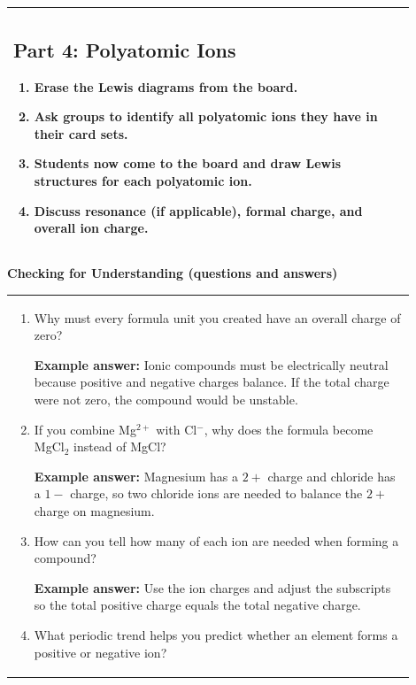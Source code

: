 \documentclass{article}
\begin{document}
\begin{flushleft}
\begin{tabular}{|p{0.9\linewidth}|}
\subsection*{Part 4: Polyatomic Ions}

\begin{enumerate}
    \item Erase the Lewis diagrams from the board.
    \item Ask groups to identify all polyatomic ions they have in their card sets.
    \item Students now come to the board and draw Lewis structures for \textbf{each polyatomic ion}.
    \item Discuss resonance (if applicable), formal charge, and overall ion charge.
\end{enumerate} \\
\hline
\end{tabular}



\newpage

\noindent
{\large \textbf{Checking for Understanding (questions and answers)}} \\[0.2em]

\begin{tabular}{|p{0.9\linewidth}|}
\hline

\begin{enumerate}

\item Why must every formula unit you created have an overall charge of zero?

\textbf{Example answer:} Ionic compounds must be electrically neutral because positive and negative charges balance. If the total charge were not zero, the compound would be unstable.

\item If you combine Mg$^{2+}$ with Cl$^{-}$, why does the formula become MgCl$_2$ instead of MgCl?

\textbf{Example answer:} Magnesium has a $2+$ charge and chloride has a $1-$ charge, so two chloride ions are needed to balance the $2+$ charge on magnesium.

\item How can you tell how many of each ion are needed when forming a compound?

\textbf{Example answer:} Use the ion charges and adjust the subscripts so the total positive charge equals the total negative charge.

\item What periodic trend helps you predict whether an element forms a positive or negative ion?


\end{enumerate}
\end{tabular}
\end{flushleft}
\end{document}
